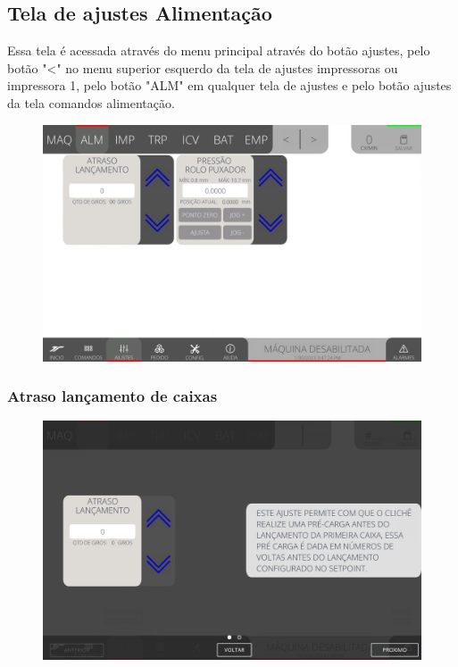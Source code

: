 \thispagestyle{fancy}
\vspace*{40 pt}
\subsection{Tela de ajustes Alimentação} \label{sec:telaConfiguracoesAlimentacao}
Essa tela é acessada através do menu principal através do botão ajustes, pelo botão "\textless{}" no menu superior esquerdo da tela de ajustes impressoras ou impressora 1, 
pelo botão "ALM" em qualquer tela de ajustes e pelo botão ajustes da tela comandos alimentação.
\vspace*{\fill}
\begin{figure}[h]
    \centering
    \includegraphics[width=480 px,height=300 px]{src/imagesICV/03-feeder/settings/1.png}
\end{figure}
\vspace*{\fill}

\newpage
\thispagestyle{fancy}
\vspace*{40 pt}
\subsubsection{\small{Atraso lançamento de caixas}} \label{sec:telaConfiguracoesAlimentacaoAtrasoLancamentoDeCaixas}
\vspace*{\fill}
\begin{figure}[h]
    \centering
    \includegraphics[width=576 px,height=360 px]{src/imagesICV/03-feeder/settings/2.png}
\end{figure}
\vspace*{\fill}

